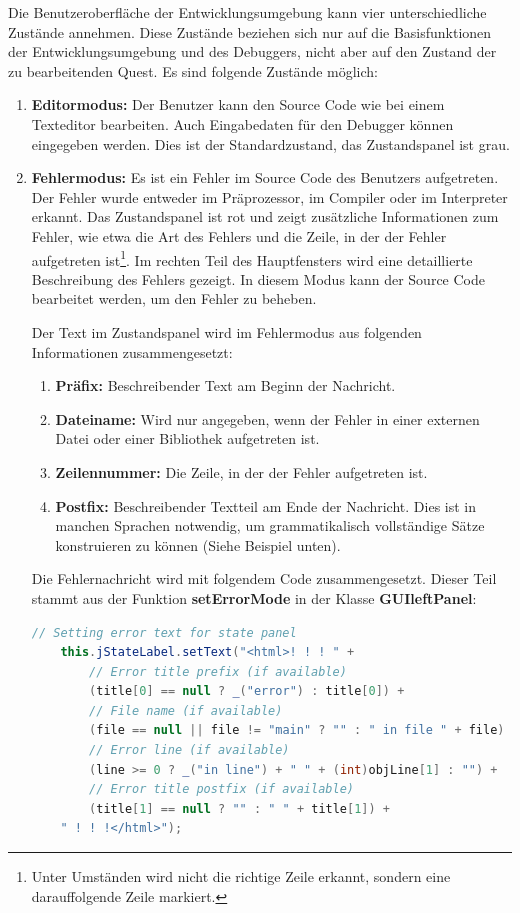 Die Benutzeroberfläche der Entwicklungsumgebung kann vier unterschiedliche Zustände annehmen. Diese Zustände beziehen sich nur auf die Basisfunktionen der Entwicklungsumgebung und des Debuggers, nicht aber auf den Zustand der zu bearbeitenden Quest. Es sind folgende Zustände möglich:
\begin{enumerate}
\item \textbf{Editormodus:} Der Benutzer kann den Source Code wie bei einem Texteditor bearbeiten. Auch Eingabedaten für den Debugger können eingegeben werden. Dies ist der Standardzustand, das Zustandspanel ist grau.
\item \textbf{Fehlermodus:} Es ist ein Fehler im Source Code des Benutzers aufgetreten. Der Fehler wurde entweder im Präprozessor, im Compiler oder im Interpreter erkannt. Das Zustandspanel ist rot und zeigt zusätzliche Informationen zum Fehler, wie etwa die Art des Fehlers und die Zeile, in der der Fehler aufgetreten ist\footnote{Unter Umständen wird nicht die richtige Zeile erkannt, sondern eine darauffolgende Zeile markiert.}. Im rechten Teil des Hauptfensters wird eine detaillierte Beschreibung des Fehlers gezeigt. In diesem Modus kann der Source Code bearbeitet werden, um den Fehler zu beheben.

Der Text im Zustandspanel wird im Fehlermodus aus folgenden Informationen zusammengesetzt:
\begin{enumerate}
\item \textbf{Präfix:} Beschreibender Text am Beginn der Nachricht.
\item \textbf{Dateiname:} Wird nur angegeben, wenn der Fehler in einer externen Datei oder einer Bibliothek aufgetreten ist.
\item \textbf{Zeilennummer:} Die Zeile, in der der Fehler aufgetreten ist.
\item \textbf{Postfix:} Beschreibender Textteil am Ende der Nachricht. Dies ist in manchen Sprachen notwendig, um grammatikalisch vollständige Sätze konstruieren zu können (Siehe Beispiel unten).
\end{enumerate}

Die Fehlernachricht wird mit folgendem Code zusammengesetzt. Dieser Teil stammt aus der Funktion \textbf{setErrorMode} in der Klasse \textbf{GUIleftPanel}:

\begin{lstlisting}[language=JAVA]
	// Setting error text for state panel
	this.jStateLabel.setText("<html>! ! ! " +
		// Error title prefix (if available)
		(title[0] == null ? _("error") : title[0]) +
		// File name (if available)
		(file == null || file != "main" ? "" : " in file " + file) + " " +
		// Error line (if available)
		(line >= 0 ? _("in line") + " " + (int)objLine[1] : "") +
		// Error title postfix (if available)
		(title[1] == null ? "" : " " + title[1]) +
	" ! ! !</html>");
\end{lstlisting}


\end{enumerate}
